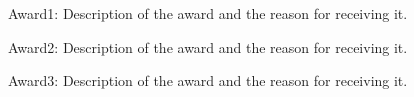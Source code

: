\begin{cvitems}
  \item {Award1: Description of the award and the reason for receiving it.}
  \item {Award2: Description of the award and the reason for receiving it.}
  \item {Award3: Description of the award and the reason for receiving it.}
\end{cvitems}
